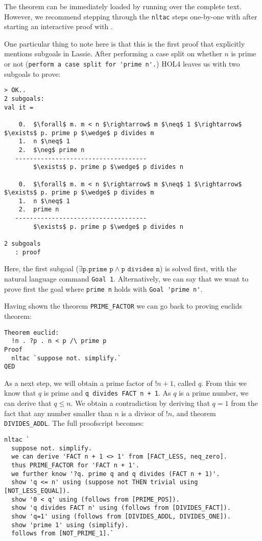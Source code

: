 The theorem can be immediately loaded by running  over the complete
text.
However, we recommend stepping through the \lstinline{nltac} steps one-by-one
with  after starting an interactive proof with .

One particular thing to note here is that this is the first proof that
explicitly mentions subgoals in Lassie.
After performing a case split on whether $n$ is prime or not
(\lstinline{perform a case split for 'prime n'.}) HOL4 leaves us with two
subgoals to prove:

\begin{lstlisting}[frame=single]
> OK..
2 subgoals:
val it =

    0.  $\forall$ m. m < n $\rightarrow$ m $\neq$ 1 $\rightarrow$ $\exists$ p. prime p $\wedge$ p divides m
    1.  n $\neq$ 1
    2.  $\neg$ prime n
   ------------------------------------
        $\exists$ p. prime p $\wedge$ p divides n

    0.  $\forall$ m. m < n $\rightarrow$ m $\neq$ 1 $\rightarrow$ $\exists$ p. prime p $\wedge$ p divides m
    1.  n $\neq$ 1
    2.  prime n
   ------------------------------------
        $\exists$ p. prime p $\wedge$ p divides n

2 subgoals
   : proof
\end{lstlisting}

Here, the first subgoal ($\exists \texttt{p}. \texttt{prime p} \wedge \texttt{p divides n}$)
is solved first, with the natural language command \lstinline{Goal 1}.
Alternatively, we can say that we want to prove first the goal where \texttt{prime n} holds with
\lstinline{Goal 'prime n'}.

Having shown the theorem \lstinline{PRIME_FACTOR} we can go back to proving
euclids theorem:
\begin{lstlisting}
Theorem euclid:
  !n . ?p . n < p /\ prime p
Proof
  nltac `suppose not. simplify.`
QED
\end{lstlisting}

As a next step, we will obtain a prime factor of $!n + 1$, called $q$.
From this we know that $q$ is prime and \lstinline{q divides FACT n + 1}.
As $q$ is a prime number, we can derive that $q \leq n$.
We obtain a contradiction by deriving that $q = 1$ from the fact that any number
smaller than $n$ is a divisor of $!n$, and theorem \lstinline{DIVIDES_ADDL}.
The full proofscript becomes:
\begin{lstlisting}[mathescape=true]
nltac `
  suppose not. simplify.
  we can derive 'FACT n + 1 <> 1' from [FACT_LESS, neq_zero].
  thus PRIME_FACTOR for 'FACT n + 1'.
  we further know '?q. prime q and q divides (FACT n + 1)'.
  show 'q <= n' using (suppose not THEN trivial using [NOT_LESS_EQUAL]).
  show '0 < q' using (follows from [PRIME_POS]).
  show 'q divides FACT n' using (follows from [DIVIDES_FACT]).
  show 'q=1' using (follows from [DIVIDES_ADDL, DIVIDES_ONE]).
  show 'prime 1' using (simplify).
  follows from [NOT_PRIME_1].`
\end{lstlisting}

